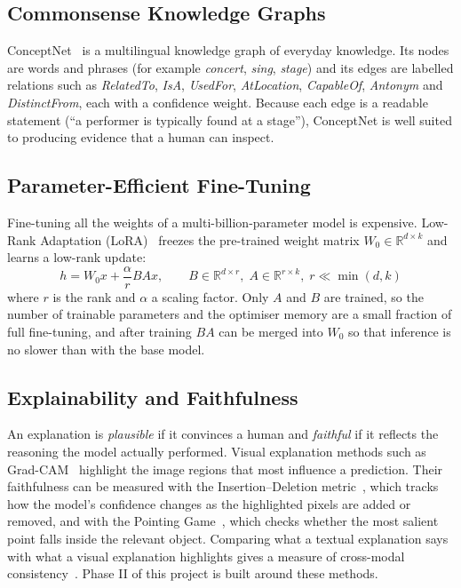 \subsection{Commonsense Knowledge Graphs}

ConceptNet~\cite{speer2017conceptnet} is a multilingual knowledge graph of everyday knowledge. Its nodes are words and phrases (for example \emph{concert}, \emph{sing}, \emph{stage}) and its edges are labelled relations such as \emph{RelatedTo}, \emph{IsA}, \emph{UsedFor}, \emph{AtLocation}, \emph{CapableOf}, \emph{Antonym} and \emph{DistinctFrom}, each with a confidence weight. Because each edge is a readable statement (``a performer is typically found at a stage''), ConceptNet is well suited to producing evidence that a human can inspect.

\subsection{Parameter-Efficient Fine-Tuning}

Fine-tuning all the weights of a multi-billion-parameter model is expensive. Low-Rank Adaptation (LoRA)~\cite{hu2022lora} freezes the pre-trained weight matrix $W_0 \in \mathbb{R}^{d \times k}$ and learns a low-rank update:
\begin{equation}
  h = W_0 x + \frac{\alpha}{r} B A x, \qquad
  B \in \mathbb{R}^{d \times r},\; A \in \mathbb{R}^{r \times k},\; r \ll \min(d,k)
  \label{eq:lora}
\end{equation}
where $r$ is the rank and $\alpha$ a scaling factor. Only $A$ and $B$ are trained, so the number of trainable parameters and the optimiser memory are a small fraction of full fine-tuning, and after training $BA$ can be merged into $W_0$ so that inference is no slower than with the base model.

\subsection{Explainability and Faithfulness}

An explanation is \emph{plausible} if it convinces a human and \emph{faithful} if it reflects the reasoning the model actually performed. Visual explanation methods such as Grad-CAM~\cite{selvaraju2017gradcam} highlight the image regions that most influence a prediction. Their faithfulness can be measured with the Insertion--Deletion metric~\cite{petsiuk2018rise}, which tracks how the model's confidence changes as the highlighted pixels are added or removed, and with the Pointing Game~\cite{zhang2018excitation}, which checks whether the most salient point falls inside the relevant object. Comparing what a textual explanation says with what a visual explanation highlights gives a measure of cross-modal consistency~\cite{zhang2024crossmodal,parcalabescu2025faithfulness}. Phase II of this project is built around these methods.

